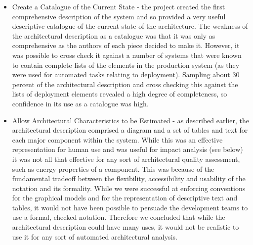 \begin{itemize}

\item Create a Catalogue of the Current State - the project created the first comprehensive description of the system and so provided a very useful descriptive catalogue of the current state of the architecture.  The weakness of the architectural description as a catalogue was that it was only as comprehensive as the authors of each piece decided to make it.  However, it was possible to cross check it against a number of systems that were known to contain complete lists of the elements in the production system (as they were used for automated tasks relating to deployment).  Sampling about 30 percent of the architectural description and cross checking this against the lists of deployment elements revealed a high degree of completeness, so confidence in its use as a catalogue was high.

\item Allow Architectural Characteristics to be Estimated - as described earlier, the architectural description comprised a diagram and a set of tables and text for each major component within the system.  While this was an effective representation for human use and was useful for impact analysis (see below) it was not all that effective for any sort of architectural quality assessment, such as energy properties of a component.  This was because of the fundamental tradeoff between the flexibility, accessibility and usability of the notation and its formality.  While we were successful at enforcing conventions for the graphical models and for the representation of descriptive text and tables, it would not have been possible to persuade the development teams to use a formal,  checked notation.  Therefore we concluded that while the architectural description could have many uses, it would not be realistic to use it for any sort of automated architectural analysis.


\end{itemize}
